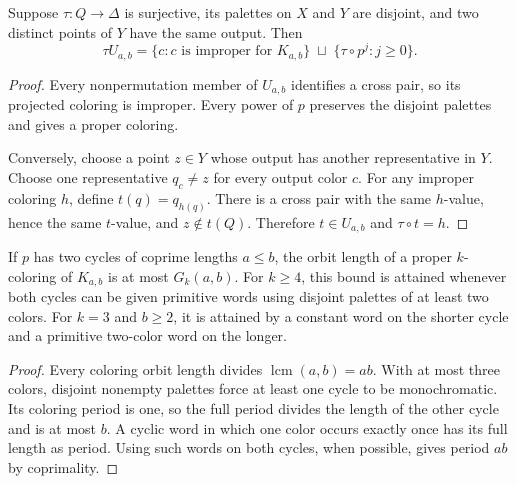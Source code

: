 \documentclass[11pt,a4paper]{article}
\numberwithin{equation}{section}
\theoremstyle{definition}
\theoremstyle{remark}
\newcommand{\D}{\Delta}
\newcommand{\lcm}{\operatorname{lcm}}
\begin{document}
\begin{lemma}\label{evo:et:lem:saturation}
Suppose $\tau:Q\to\D$ is surjective, its palettes on $X$ and $Y$ are
disjoint, and two distinct points of $Y$ have the same output. Then
\begin{equation}\label{evo:et:eq:saturation}
 \tau U_{a,b}
 =\{c:c\text{ is improper for }K_{a,b}\}
   \;\sqcup\;\{\tau\circ p^j:j\ge0\}.
\end{equation}
\end{lemma}
\begin{proof}
Every nonpermutation member of $U_{a,b}$ identifies a cross pair, so its
projected coloring is improper. Every power of $p$ preserves the disjoint
palettes and gives a proper coloring.

Conversely, choose a point $z\in Y$ whose output has another representative
in $Y$. Choose one representative $q_c\ne z$ for every output color $c$. For
any improper coloring $h$, define $t(q)=q_{h(q)}$. There is a cross pair with
the same $h$-value, hence the same $t$-value, and $z\notin t(Q)$. Therefore
$t\in U_{a,b}$ and $\tau\circ t=h$.
\end{proof}

\begin{lemma}\label{evo:et:lem:properperiod}
If $p$ has two cycles of coprime lengths $a\le b$, the orbit length of a
proper $k$-coloring of $K_{a,b}$ is at most $G_k(a,b)$. For $k\ge4$, this
bound is attained whenever both cycles can be given primitive words using
disjoint palettes of at least two colors. For $k=3$ and $b\ge2$, it is
attained by a constant word on the shorter cycle and a primitive two-color
word on the longer.
\end{lemma}
\begin{proof}
Every coloring orbit length divides $\lcm(a,b)=ab$. With at most three colors,
disjoint nonempty palettes force at least one cycle to be monochromatic. Its
coloring period is one, so the full period divides the length of the other
cycle and is at most $b$. A cyclic word in which one color occurs exactly
once has its full length as period. Using such words on both cycles, when
possible, gives period $ab$ by coprimality.
\end{proof}
\end{document}
